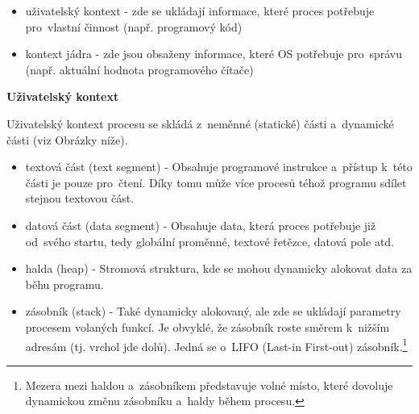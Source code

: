 \begin{itemize}
    \item uživatelský kontext - zde se ukládají informace, které proces potřebuje pro~vlastní činnost (např. programový kód)
    \item kontext jádra -  zde jsou obsaženy informace, které OS potřebuje pro~správu (např. aktuální hodnota programového čítače)
\end{itemize}

\begin{Large}
    \vspace{0,5cm}
    \textbf{Uživatelský kontext}
\end{Large}

Uživatelský kontext procesu se skládá z~neměnné (statické) části a~dynamické části (viz Obrázky níže).

\begin{itemize}
    \item textová část (text segment) - Obsahuje programové instrukce a~přístup k~této části je pouze pro~čtení. Díky tomu může více procesů téhož programu sdílet stejnou textovou část.
    \item datová část (data segment) - Obsahuje data, která proces potřebuje již od~svého startu, tedy globální proměnné, textové řetězce, datová pole atd. 
    \item halda (heap) - Stromová struktura, kde se mohou dynamicky alokovat data za běhu programu.
    \item zásobník (stack) - Také dynamicky alokovaný, ale zde se ukládají parametry procesem volaných funkcí. Je obvyklé, že zásobník roste směrem k~nižším adresám (tj. vrchol jde dolů). Jedná se o~LIFO (Last-in First-out) zásobník.\footnote{Mezera mezi haldou a~zásobníkem představuje volné místo, které dovoluje dynamickou změnu zásobníku a~haldy během procesu.} 
\end{itemize}

